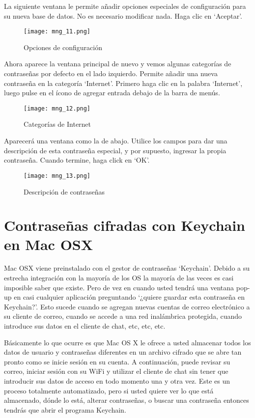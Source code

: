 \documentclass[10pt,a5paper,twoside,,]{book}
\begin{document}
La siguiente ventana le permite añadir opciones especiales de
configuración para su nueva base de datos. No es necesario modificar
nada. Haga clic en `Aceptar'.

\begin{figure}[htbp]
\centering
\texttt{[image: mng\_11.png]}
\caption{Opciones de configuración}
\end{figure}

Ahora aparece la ventana principal de nuevo y vemos algunas categorías
de contraseñas por defecto en el lado izquierdo. Permite añadir una
nueva contraseña en la categoría `Internet'. Primero haga clic en la
palabra `Internet', luego pulse en el ícono de agregar entrada debajo de
la barra de menús.

\begin{figure}[htbp]
\centering
\texttt{[image: mng\_12.png]}
\caption{Categorías de Internet}
\end{figure}

Aparecerá una ventana como la de abajo. Utilice los campos para dar una
descripción de esta contraseña especial, y por supuesto, ingresar la
propia contraseña. Cuando termine, haga click en `OK'.

\begin{figure}[htbp]
\centering
\texttt{[image: mng\_13.png]}
\caption{Descripción de contraseñas}
\end{figure}

\section{Contraseñas cifradas con Keychain en Mac
OSX}\label{contraseuxf1as-cifradas-con-keychain-en-mac-osx}

Mac OSX viene preinstalado con el gestor de contraseñas `Keychain'.
Debido a su estrecha integración con la mayoría de los OS la mayoría de
las veces es casi imposible saber que existe. Pero de vez en cuando
usted tendrá una ventana pop-up en casi cualquier aplicación preguntando
`¿quiere guardar esta contraseña en Keychain?'. Esto sucede cuando se
agregan nuevas cuentas de correo electrónico a su cliente de correo,
cuando se accede a una red inalámbrica protegida, cuando introduce sus
datos en el cliente de chat, etc, etc, etc.

Básicamente lo que ocurre es que Mac OS X le ofrece a usted almacenar
todos los datos de usuario y contraseñas diferentes en un archivo
cifrado que se abre tan pronto como se inicie sesión en su cuenta. A
continuación, puede revisar su correo, iniciar sesión con su WiFi y
utilizar el cliente de chat sin tener que introducir sus datos de acceso
en todo momento una y otra vez. Este es un proceso totalmente
automatizado, pero si usted quiere ver lo que está almacenado, dónde lo
está, alterar contraseñas, o buscar una contraseña entonces tendrás que
abrir el programa Keychain.
\end{document}

